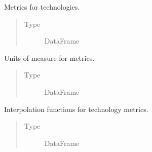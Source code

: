 \documentclass[letterpaper,10pt,english]{sphinxmanual}
\begin{document}
\begin{fulllineitems}
\begin{fulllineitems}
\end{fulllineitems}


\begin{fulllineitems}
\label{\detokenize{tyche:tyche.Evaluator.Evaluator.metrics}}
Metrics for technologies.
\begin{quote}\begin{description}
\item[{Type}] \leavevmode
DataFrame

\end{description}\end{quote}

\end{fulllineitems}


\begin{fulllineitems}
\label{\detokenize{tyche:tyche.Evaluator.Evaluator.units}}
Units of measure for metrics.
\begin{quote}\begin{description}
\item[{Type}] \leavevmode
DataFrame

\end{description}\end{quote}

\end{fulllineitems}


\begin{fulllineitems}
\label{\detokenize{tyche:tyche.Evaluator.Evaluator.interpolators}}
Interpolation functions for technology metrics.
\begin{quote}\begin{description}
\item[{Type}] \leavevmode
DataFrame

\end{description}\end{quote}


\end{fulllineitems}
\end{fulllineitems}
\end{document}
